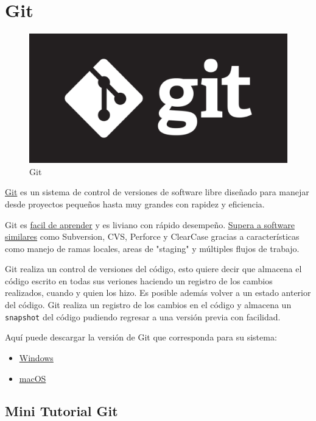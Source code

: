\chapter{Git}
\begin{figure}
\centering
\includegraphics{img/git-black.png}
\caption{Git}
\end{figure}

\href{https://git-scm.com/}{Git} es un sistema de control de versiones
de software libre diseñado para manejar desde proyectos pequeños hasta
muy grandes con rapidez y eficiencia.

Git es \href{https://git-scm.com/documentation}{facil de aprender} y es
liviano con rápido desempeño.
\href{https://git-scm.com/about/small-and-fast}{Supera a software
similares} como Subversion, CVS, Perforce y ClearCase gracias a
características como manejo de ramas locales, areas de "staging" y
múltiples flujos de trabajo.

Git realiza un control de versiones del código, esto quiere decir que
almacena el código escrito en todas sus veriones haciendo un registro de
los cambios realizados, cuando y quien los hizo. Es posible además
volver a un estado anterior del código. Git realiza un registro de los
cambios en el código y almacena un \texttt{snapshot} del código pudiendo
regresar a una versión previa con facilidad.

Aquí puede descargar la versión de Git que corresponda para su sistema:

\begin{itemize}
\item
  \href{https://git-scm.com/download/win}{Windows}
\item
  \href{https://git-scm.com/download/mac}{macOS}
\end{itemize}

\section{Mini Tutorial Git}

